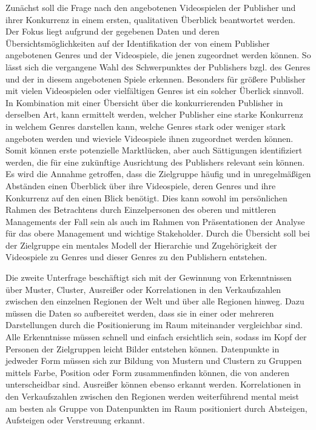 \documentclass[usegeometry=true]{scrartcl}
\begin{document}
Zunächst soll die Frage nach den angebotenen Videospielen der Publisher und ihrer Konkurrenz in einem ersten, qualitativen Überblick beantwortet werden. 
Der Fokus liegt aufgrund der gegebenen Daten und deren Übersichtsmöglichkeiten auf der Identifikation der von einem Publisher angebotenen Genres und der Videospiele, die jenen zugeordnet werden können. 
So lässt sich die vergangene Wahl des Schwerpunktes der Publishers bzgl. des Genres und der in diesem angebotenen Spiele erkennen. 
Besonders für größere Publisher mit vielen Videospielen oder vielfältigen Genres ist ein solcher Überlick sinnvoll.
In Kombination mit einer Übersicht über die konkurrierenden Publisher in derselben Art, kann ermittelt werden, welcher Publisher eine starke Konkurrenz in welchem Genres darstellen kann, welche Genres stark oder weniger stark angeboten werden und wieviele Videospiele ihnen zugeordnet werden können.
Somit können erste potenzielle Marktlücken, aber auch Sättigungen identifiziert werden, die für eine zukünftige Ausrichtung des Publishers relevant sein können. 
Es wird die Annahme getroffen, dass die Zielgruppe häufig und in unregelmäßigen Abständen einen Überblick über ihre Videospiele, deren Genres und ihre Konkurrenz auf den einen Blick benötigt. 
Dies kann sowohl im persönlichen Rahmen des Betrachtens durch Einzelpersonen des oberen und mittleren Managements der Fall sein als auch im Rahmen von Präsentationen der Analyse für das obere Management und wichtige Stakeholder.
Durch die Übersicht soll bei der Zielgruppe ein mentales Modell der Hierarchie und Zugehörigkeit der Videospiele zu Genres und dieser Genres zu den Publishern entstehen. 

Die zweite Unterfrage beschäftigt sich mit der Gewinnung von Erkenntnissen über Muster, Cluster, Ausreißer oder Korrelationen in den Verkaufszahlen zwischen den einzelnen Regionen der Welt und über alle Regionen hinweg.
Dazu müssen die Daten so aufbereitet werden, dass sie in einer oder mehreren Darstellungen durch die Positionierung im Raum miteinander vergleichbar sind. 
Alle Erkenntnisse müssen schnell und einfach ersichtlich sein, sodass im Kopf der Personen der Zielgruppen leicht Bilder entstehen können.  
Datenpunkte in jedweder Form müssen sich zur Bildung von Mustern und Clustern zu Gruppen mittels Farbe, Position oder Form zusammenfinden können, die von anderen unterscheidbar sind. 
Ausreißer können ebenso erkannt werden.
Korrelationen in den Verkaufszahlen zwischen den Regionen werden weiterführend mental meist am besten als Gruppe von Datenpunkten im Raum positioniert durch Absteigen, Aufsteigen oder Verstreuung erkannt.
\end{document}
